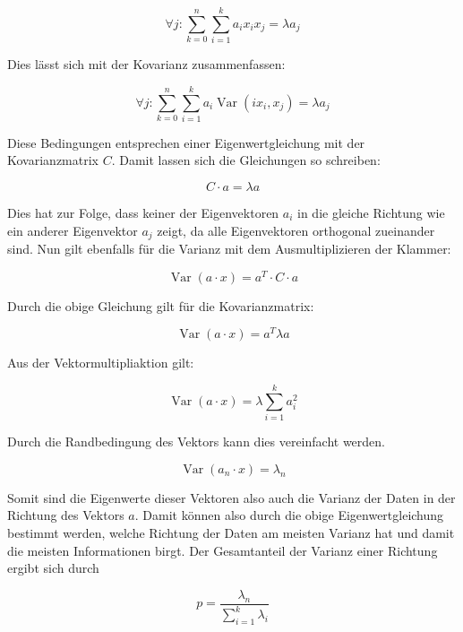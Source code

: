 \documentclass[11pt]{article} %
\DeclareMathOperator{\Var}{Var}
\begin{document}
\begin{equation}
\forall j :  \sum_{k=0}^n  \sum_{i = 1}^k a_i x_i x_j =  \lambda a_j 
\end{equation}

Dies lässt sich mit der Kovarianz zusammenfassen:

\begin{equation}
\forall j :  \sum_{k=0}^n  \sum_{i = 1}^k a_i \Var(i x_i, x_j) =  \lambda a_j 
\end{equation}

Diese Bedingungen entsprechen einer Eigenwertgleichung mit der Kovarianzmatrix $C$. Damit lassen sich die Gleichungen so schreiben:

\begin{equation}
C \cdot a=  \lambda a 
\end{equation}

Dies hat zur Folge, dass keiner der Eigenvektoren $a_i$ in die gleiche Richtung wie ein anderer Eigenvektor $a_j$ zeigt, da alle Eigenvektoren orthogonal zueinander sind. Nun gilt ebenfalls für die Varianz mit dem Ausmultiplizieren der Klammer:

\begin{equation}
\Var(a \cdot x) = a^T \cdot C \cdot a
\end{equation}

Durch die obige Gleichung gilt für die Kovarianzmatrix:

\begin{equation}
\Var(a \cdot x) = a^T \lambda a 
\end{equation}

Aus der Vektormultipliaktion gilt:

\begin{equation}
\Var(a \cdot x) = \lambda \sum_{i=1}^k a_i^2
\end{equation}

Durch die Randbedingung des Vektors kann dies vereinfacht werden.

\begin{equation}
\Var(a_n \cdot x) = \lambda_n 
\end{equation}

Somit sind die Eigenwerte dieser Vektoren also auch die Varianz der Daten in der Richtung des Vektors $a$. Damit können also durch die obige Eigenwertgleichung bestimmt werden, welche Richtung der Daten am meisten Varianz hat und damit die meisten Informationen birgt.
Der Gesamtanteil der Varianz einer Richtung ergibt sich durch

\begin{equation}
p = \frac{\lambda_n} {\sum_{i=1}^k \lambda_i} 
\end{equation}
\end{document}
